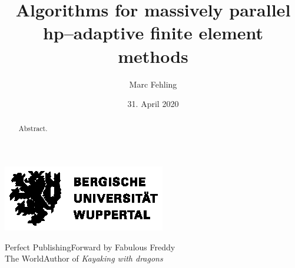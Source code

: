 \documentclass[10pt,a4paper,twoside,openright]{memoir}
\author{Marc Fehling}
\title{Algorithms for massively parallel hp--adaptive finite element methods}
\date{31. April 2020}
\begin{document}
  \begin{titlingpage}
    \begin{center}
      \vspace*{\fill}
      \includegraphics[width=.75\textwidth]{logos/BUW_Logo-schwarz.eps}\bigskip
      \vspace*{\fill}\vspace*{\fill}\par
      {\Huge \thetitle\bigskip\par}
      {\Huge \theauthor\bigskip\par}
      {\LARGE \thedate\bigskip\bigskip\par}
    \end{center}
    {\large Perfect Publishing\hspace*{\fill}Forward by Fabulous Freddy\smallskip\\
    The World\hspace*{\fill}Author of \emph{Kayaking with dragons}}
  \end{titlingpage}
  
  
  
  \frontmatter
  
  \abstractintoc
  \begin{abstract}
    Abstract.
  \end{abstract}
  \clearpage
  
  
  \begin{KeepFromToc} %
    \tableofcontents
  \end{KeepFromToc}
  \clearpage
  
  
  
  \listoftables
  \clearpage
  
  \listoffigures
  \clearpage
  
  \printglossary[type=\acronymtype, title={List of Abbreviations}]
  
  
  
  
  
  \mainmatter
  
  
  
  
  
  
  
  \appendix
  \glsresetall
  
  
  
  
  
  \backmatter
  
  \printbibliography[title=Bibliography, keyword=primary]
  \newrefcontext[sorting=none]
  \printbibliography[env=bibliographyNUM, title=References, keyword=secondary, resetnumbers]
  
  \listoftodos
\end{document}
